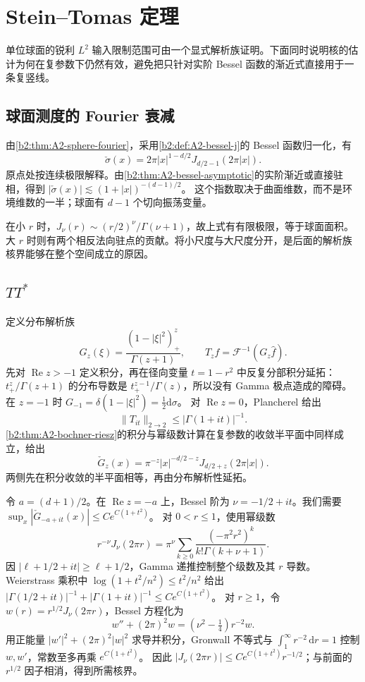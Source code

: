 \section{Stein–Tomas 定理}
\label{b2:sec:2304}

单位球面的锐利 \(L^2\) 输入限制范围可由一个显式解析族证明。下面同时说明核的估计为何在复参数下仍然有效，避免把只针对实阶 Bessel 函数的渐近式直接用于一条复竖线。

\subsection{球面测度的 Fourier 衰减}
\label{b2:subsec:230401}

由\cref{b2:thm:A2-sphere-fourier}，采用\cref{b2:def:A2-bessel-j}的 Bessel 函数归一化，有
\[
 \check\sigma(x)=2\pi |x|^{1-d/2}J_{d/2-1}(2\pi|x|).
\]
原点处按连续极限解释。由\cref{b2:thm:A2-bessel-asymptotic}的实阶渐近或直接驻相，得到
\(|\check\sigma(x)|\lesssim(1+|x|)^{-(d-1)/2}\)。
这个指数取决于曲面维数，而不是环境维数的一半；球面有 \(d-1\) 个切向振荡变量。

\ProseParagraphBreak
在小 \(r\) 时，\(J_\nu(r)\sim(r/2)^\nu/\Gamma(\nu+1)\)，故上式有有限极限，等于球面面积。大 \(r\) 时则有两个相反法向驻点的贡献。将小尺度与大尺度分开，是后面的解析族核界能够在整个空间成立的原因。

\subsection{\texorpdfstring{\(TT^*\)}{TT*}}
\label{b2:subsec:230402}

定义分布解析族
\[
 G_z(\xi)=\frac{(1-|\xi|^2)_+^z}{\Gamma(z+1)},\qquad
 T_zf=\mathcal F^{-1}(G_z\widehat f).
\]
先对 \(\operatorname{Re}z>-1\) 定义积分，再在径向变量 \(t=1-r^2\) 中反复分部积分延拓：\(t_+^z/\Gamma(z+1)\) 的分布导数是
\(t_+^{z-1}/\Gamma(z)\)，所以没有 Gamma 极点造成的障碍。
在 \(z=-1\) 时 \(G_{-1}=\delta(1-|\xi|^2)=\tfrac12\mathrm d\sigma\)。
对 \(\operatorname{Re}z=0\)，Plancherel 给出
\[
 \|T_{it}\|_{2\to2}\le|\Gamma(1+it)|^{-1}.
\]
\cref{b2:thm:A2-bochner-riesz}的积分与幂级数计算在复参数的收敛半平面中同样成立，给出
\[
 \check G_z(x)=\pi^{-z}|x|^{-d/2-z}J_{d/2+z}(2\pi|x|).
\]
两侧先在积分收敛的半平面相等，再由分布解析性延拓。

\ProseParagraphBreak
令 \(a=(d+1)/2\)。在 \(\operatorname{Re}z=-a\) 上，Bessel 阶为
\(\nu=-1/2+it\)。我们需要
\(\sup_x|\check G_{-a+it}(x)|\le C e^{C(1+t^2)}\)。
对 \(0<r\le1\)，使用幂级数
\[
 r^{-\nu}J_\nu(2\pi r)
 =\pi^\nu\sum_{k\ge0}\frac{(-\pi^2r^2)^k}{k!\Gamma(k+\nu+1)}.
\]
因 \(|\ell+1/2+it|\ge\ell+1/2\)，Gamma 递推控制整个级数及其 \(r\) 导数。Weierstrass 乘积中
\(\log(1+t^2/n^2)\le t^2/n^2\) 给出
\(|\Gamma(1/2+it)|^{-1}+|\Gamma(1+it)|^{-1}\le C e^{C(1+t^2)}\)。
对 \(r\ge1\)，令 \(w(r)=r^{1/2}J_\nu(2\pi r)\)，Bessel 方程化为
\[
 w''+(2\pi)^2w=(\nu^2-\tfrac14)r^{-2}w.
\]
用正能量 \(|w'|^2+(2\pi)^2|w|^2\) 求导并积分，Gronwall 不等式与
\(\int_1^\infty r^{-2}\,\mathrm dr=1\) 控制 \(w,w'\)，常数至多再乘 \(e^{C(1+t^2)}\)。
因此 \(|J_\nu(2\pi r)|\le C e^{C(1+t^2)}r^{-1/2}\)；与前面的 \(r^{1/2}\) 因子相消，得到所需核界。

